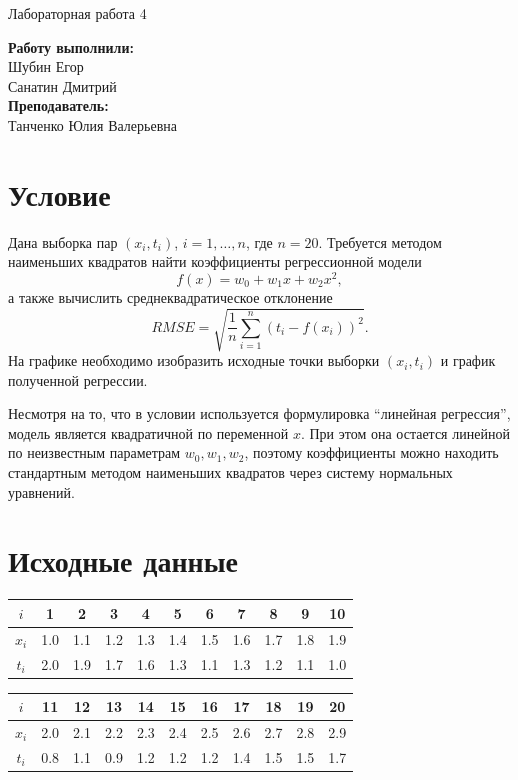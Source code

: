 \documentclass[12pt,a4paper]{article}
\begin{document}
\begin{center}
    {\LARGE Лабораторная работа 4}
\end{center}
\begin{flushright}
\textbf{Работу выполнили:} \\
Шубин Егор\\
Санатин Дмитрий\\
\textbf{Преподаватель:} \\
Танченко Юлия Валерьевна
\end{flushright}

\section*{Условие}
Дана выборка пар $(x_i,t_i)$, $i=1,\dots,n$, где $n=20$. Требуется методом
наименьших квадратов найти коэффициенты регрессионной модели
\[
    f(x)=w_0+w_1x+w_2x^2,
\]
а также вычислить среднеквадратическое отклонение
\[
    RMSE=\sqrt{\frac{1}{n}\sum_{i=1}^{n}\left(t_i-f(x_i)\right)^2}.
\]
На графике необходимо изобразить исходные точки выборки $(x_i,t_i)$ и график
полученной регрессии.

Несмотря на то, что в условии используется формулировка ``линейная
регрессия'', модель является квадратичной по переменной $x$. При этом она
остается линейной по неизвестным параметрам $w_0,w_1,w_2$, поэтому коэффициенты
можно находить стандартным методом наименьших квадратов через систему
нормальных уравнений.

\section*{Исходные данные}
\begin{center}
\begin{tabular}{ccccccccccc}
\toprule
$i$ & 1 & 2 & 3 & 4 & 5 & 6 & 7 & 8 & 9 & 10 \\
\midrule
$x_i$ & 1.0 & 1.1 & 1.2 & 1.3 & 1.4 & 1.5 & 1.6 & 1.7 & 1.8 & 1.9 \\
$t_i$ & 2.0 & 1.9 & 1.7 & 1.6 & 1.3 & 1.1 & 1.3 & 1.2 & 1.1 & 1.0 \\
\bottomrule
\end{tabular}
\end{center}

\begin{center}
\begin{tabular}{ccccccccccc}
\toprule
$i$ & 11 & 12 & 13 & 14 & 15 & 16 & 17 & 18 & 19 & 20 \\
\midrule
$x_i$ & 2.0 & 2.1 & 2.2 & 2.3 & 2.4 & 2.5 & 2.6 & 2.7 & 2.8 & 2.9 \\
$t_i$ & 0.8 & 1.1 & 0.9 & 1.2 & 1.2 & 1.2 & 1.4 & 1.5 & 1.5 & 1.7 \\
\bottomrule
\end{tabular}
\end{center}
\end{document}
